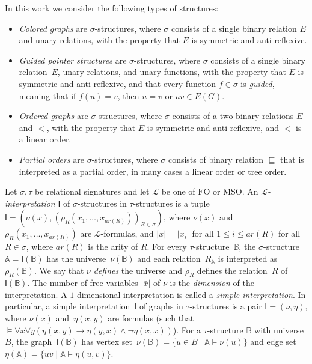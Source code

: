 \documentclass[1p,number,a4paper]{elsarticle}
\theoremstyle{remark}
\newcommand{\Ll}{\mathcal{L}}
\newcommand{\strA}{\mathbb{A}}
\newcommand{\strB}{\mathbb{B}}
\renewcommand{\FO}{\mathrm{FO}}
\newcommand{\MSO}{\mathrm{MSO}}
\begin{document}
\medskip
In this work we consider the following types of structures:
\begin{itemize}
    \item \emph{Colored graphs} are $\sigma$-structures, where $\sigma$ consists of a single binary relation $E$ and unary relations, with the property that
	$E$ is symmetric and anti-reflexive. 
    \item \emph{Guided pointer structures} are $\sigma$-structures, where $\sigma$ consists of a single binary relation~$E$, unary relations, and unary functions, with the property that $E$ is symmetric  and anti-reflexive, and that every function $f\in\sigma$ is \emph{guided}, meaning that if $f(u)=v$, then $u=v$ or $uv\in E(G)$. 
    \item \emph{Ordered graphs} are $\sigma$-structures, where $\sigma$ consists of a two binary relations $E$ and $<$, with the property that $E$ is symmetric and anti-reflexive, and $<$ is a linear order. 
    \item \emph{Partial orders} are $\sigma$-structures, where $\sigma$ consists of binary relation $\sqsubseteq$ that is interpreted as a partial order, in many cases a linear order or tree order. 
\end{itemize}

Let $\sigma,\tau$ be relational signatures and let $\Ll$ be one of $\FO$ or $\MSO$. 
An \emph{$\Ll$-interpretation} $\mathsf{I}$ of $\sigma$-structures in $\tau$-structures is a tuple $\mathsf I=(\nu(\bar x), (\rho_R(\bar x_1,\ldots, \bar x_{ar(R)}))_{R\in \sigma})$, where $\nu(\bar x)$ and $\rho_R(\bar x_1,\ldots, \bar x_{ar(R)})$ are $\Ll$-formulas, and 
$|\bar x|=|\bar x_i|$ for all $1\leq i\leq ar(R)$ for all $R\in \sigma$, where $ar(R)$ is the arity of $R$.  
For every $\tau$-structure~$\strB$, the $\sigma$-structure $\strA=\mathsf I(\strB)$
has the universe~$\nu(\strB)$ and each relation~$R_\strA$ is interpreted as $\rho_R(\strB)$. 
We say that $\nu$ \emph{defines} the universe and $\rho_R$ defines the relation~$R$ of $\mathsf{I}(\strB)$. 
The number of free variables $|\bar x|$ of $\nu$ is the \emph{dimension} of the interpretation. 
A \mbox{$1$-dimensional} interpretation is called a \emph{simple interpretation}. 
In particular, a simple interpretation~$\mathsf{I}$ of graphs in $\tau$-structures is a pair $\mathsf I=(\nu, \eta)$, where $\nu(x)$ and~$\eta(x,y)$ are formulas (such that $\models\forall x \forall y (\eta(x,y)\rightarrow \eta(y,x)\wedge \neg\eta(x,x))$). 
For a $\tau$-structure $\strB$ with universe $B$, the graph~$\mathsf I(\strB)$
has vertex set~$\nu(\strB)=\{u\in B\mid \strA\models\nu(u)\}$ and edge set $\eta(\strA)=\{uv \mid \strA\models\eta(u,v)\}$. 
\end{document}
